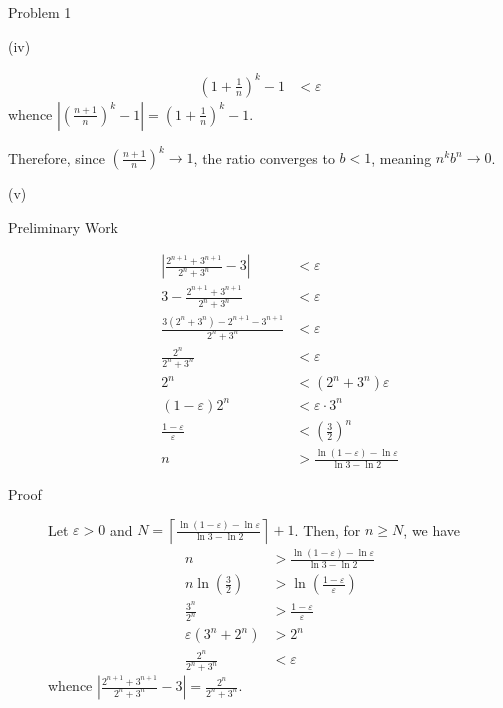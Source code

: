 \documentclass[8pt]{extarticle}
\begin{document}
\begin{problem}{Problem 1}
\begin{problem}{(iv)}
\begin{description}
\begin{align*}
            \left(1 + \frac{1}{n}\right)^{k} - 1 &< \varepsilon
          \end{align*}
          whence $\displaystyle\left|\left(\frac{n+1}{n}\right)^{k} - 1\right| = \left(1 + \frac{1}{n}\right)^{k} - 1$. 
      \end{description}
      Therefore, since $\displaystyle \left(\frac{n+1}{n}\right)^k \rightarrow 1$, the ratio converges to $b < 1$, meaning $n^kb^n \rightarrow 0$.
    \end{problem}
    \begin{problem}{(v)}
      \begin{description}
        \item[Preliminary Work]
          \begin{align*}
            \left|\frac{2^{n+1} + 3^{n+1}}{2^n + 3^n} - 3 \right| &< \varepsilon\\
            3 - \frac{2^{n+1} + 3^{n+1}}{2^n + 3^n} &< \varepsilon\\
            \frac{3(2^n + 3^n) - 2^{n+1} - 3^{n+1}}{2^n + 3^n} &< \varepsilon\\
            \frac{2^n}{2^n + 3^n} &< \varepsilon\\
            2^n &< (2^n + 3^n)\varepsilon\\
            (1-\varepsilon)2^n &< \varepsilon \cdot 3^n\\
            \frac{1-\varepsilon}{\varepsilon} &< \left(\frac{3}{2}\right)^n\\
            n &> \frac{\ln(1-\varepsilon) - \ln\varepsilon}{\ln 3 - \ln 2}
          \end{align*}
        \item[Proof] Let $\varepsilon > 0$ and $\displaystyle N = \left\lceil \frac{\ln(1-\varepsilon) - \ln\varepsilon}{\ln 3 - \ln 2}\right\rceil + 1$. Then, for $n\geq N$, we have
          \begin{align*}
            n &> \frac{\ln(1-\varepsilon) - \ln\varepsilon}{\ln 3 - \ln 2}\\
            n\ln \left(\frac{3}{2}\right) &> \ln \left(\frac{1-\varepsilon}{\varepsilon}\right)\\
            \frac{3^n}{2^n} &> \frac{1-\varepsilon}{\varepsilon}\\
            \varepsilon (3^n + 2^n) &> 2^n\\
            \frac{2^n}{2^n + 3^n} &< \varepsilon
          \end{align*}
          whence $\displaystyle\left|\frac{2^{n+1} + 3^{n+1}}{2^n + 3^n} - 3\right| = \frac{2^n}{2^n + 3^n}$.
      \end{description}
    \end{problem}
  \end{problem}
\end{document}
